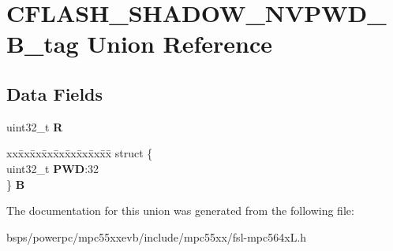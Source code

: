\hypertarget{unionCFLASH__SHADOW__NVPWD__32B__tag}{}\section{C\+F\+L\+A\+S\+H\+\_\+\+S\+H\+A\+D\+O\+W\+\_\+\+N\+V\+P\+W\+D\+\_\+B\+\_\+tag Union Reference}
\label{unionCFLASH__SHADOW__NVPWD__32B__tag}
\subsection*{Data Fields}
\begin{DoxyCompactItemize}
\item 
\mbox{\label{unionCFLASH__SHADOW__NVPWD__32B__tag_ac57d3ad64f4762837e0602725d9f5a0b}} 
uint32\+\_\+t {\bfseries R}
\item 
\mbox{\label{unionCFLASH__SHADOW__NVPWD__32B__tag_a79146cc82c1c6ae7d7d71d60ade95b78}} 
\begin{tabbing}
xx\=xx\=xx\=xx\=xx\=xx\=xx\=xx\=xx\=\kill
struct \{\\
\>uint32\_t {\bfseries PWD}:32\\
\} {\bfseries B}\\

\end{tabbing}\end{DoxyCompactItemize}


The documentation for this union was generated from the following file\+:\begin{DoxyCompactItemize}
\item 
bsps/powerpc/mpc55xxevb/include/mpc55xx/fsl-\/mpc564x\+L.\+h\end{DoxyCompactItemize}
